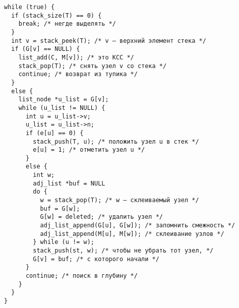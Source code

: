 \begin{lstlisting}[escapechar=`]
while (true) {
  if (stack_size(T) == 0) {
    break; /* негде выделять */
  }
  int v = stack_peek(T); /* v — верхний элемент стека */
  if (G[v] == NULL) {
    list_add(C, M[v]); /* это КСС */
    stack_pop(T); /* снять узел v со стека */
    continue; /* возврат из тупика */
  }
  else {
    list_node *u_list = G[v];
    while (u_list != NULL) {
      int u = u_list->v;
      u_list = u_list->n;
      if (e[u] == 0) {
        stack_push(T, u); /* положить узел u в стек */
        e[u] = 1; /* отметить узел u */
      }
      else {
        int w;
        adj_list *buf = NULL
        do {
          w = stack_pop(T); /* w — склеиваемый узел */
          buf = G[w];
          G[w] = deleted; /* удалить узел */
          adj_list_append(G[u], G[w]); /* запомнить смежность */
          adj_list_append(M[u], M[w]); /* склеивание узлов */
        } while (u != w);
        stack_push(st, w); /* чтобы не убрать тот узел, */
        G[v] = buf; /* с которого начали */
      }
      continue; /* поиск в глубину */
    }
  }
}
\end{lstlisting}
